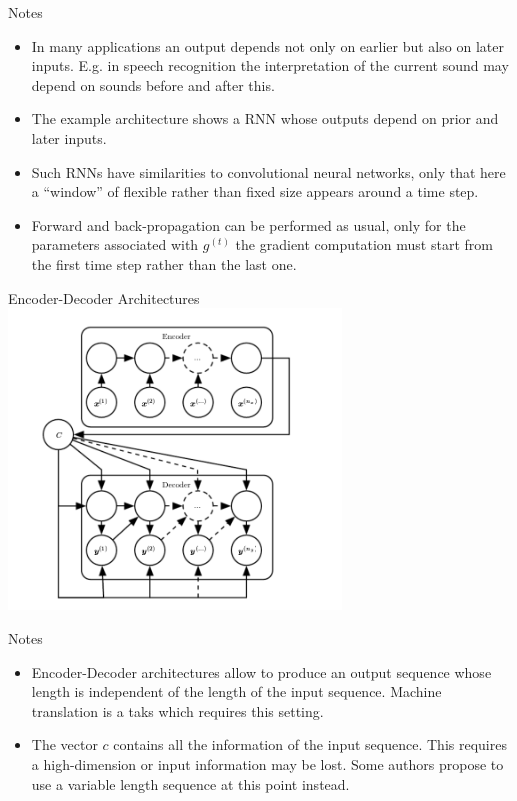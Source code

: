 \begin{frame}[beamer:0]{Notes}
\begin{itemize}
\item In many applications an output depends not only on earlier but also on later inputs. E.g. in speech recognition the interpretation of the current sound may depend on sounds before and after this. 
\item The example architecture shows a RNN whose outputs depend on prior and later inputs. 
\item Such RNNs have similarities to convolutional neural networks, only that here a ``window'' of flexible rather than fixed size appears around a time step.
\item Forward and back-propagation can be performed as usual, only for the parameters associated with $g^{(t)}$  the gradient computation must start from the first time step rather than the last one.
\end{itemize}
\end{frame}

\begin{frame}{Encoder-Decoder Architectures}
\centering
\includegraphics[height=8cm]{data/encode-decode.png}
\end{frame}

\begin{frame}[beamer:0]{Notes}
\begin{itemize}
\item Encoder-Decoder architectures allow to produce an output sequence whose length is independent of the length of the input sequence. Machine translation is a taks which requires this setting.
\item The vector $c$ contains all the information of the input sequence. This requires a high-dimension or input information may be lost. Some authors propose to use a variable length sequence at this point instead.
\end{itemize}
\end{frame}


